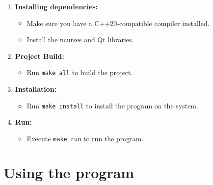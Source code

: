 \documentclass{article}
\begin{document}
\begin{enumerate}
    \item \textbf{Installing dependencies:}
        \begin{itemize}
            \item Make sure you have a C++20-compatible compiler installed.
            \item Install the ncurses and Qt libraries.
        \end{itemize}
    \item \textbf{Project Build:}
        \begin{itemize}
            \item Run \texttt{make all} to build the project.
        \end{itemize}
    \item \textbf{Installation:}
        \begin{itemize}
            \item Run \texttt{make install} to install the program on the system.
        \end{itemize}
    \item \textbf{Run:}
        \begin{itemize}
            \item Execute \texttt{make run} to run the program.
        \end{itemize}
\end{enumerate}

\section{Using the program}
\end{document}
